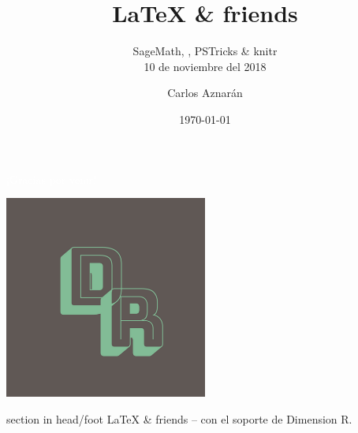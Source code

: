 \documentclass[spanish,9pt]{beamer}
\title[\LaTeX{} \& friends]{\LaTeX{} \& friends}
\subtitle{SageMath, \arara, PSTricks \& knitr\\[\baselineskip]
10 de noviembre del 2018}
\author[Dimension R]{Carlos Aznarán}
\institute[Universidad Nacional de Ingeniería]{Matemáticas\\
Facultad de Ciencias\\
Universidad Nacional de Ingeniería}
\date[\today]{\today}
\begin{document}
\begin{frame}
\titlepage
\end{frame}

\begin{frame}
\frametitle{\contentsname}
\tableofcontents
\end{frame}



%
%
%
%

\begin{frame}[plain,b]
\centering
\huge \textcolor{white}{¡Gracias por venir!}
\normalsize
\begin{center}
	\includegraphics[width=0.5\textwidth]{DimensionR}\\
\end{center}
\vspace*{\fill}

\begin{beamercolorbox}[wd=\paperwidth]{section in head/foot}
\centering\large
\LaTeX{} \& friends -- con el soporte de Dimension R.
\vskip10pt
\end{beamercolorbox}
\end{frame}
\end{document}
